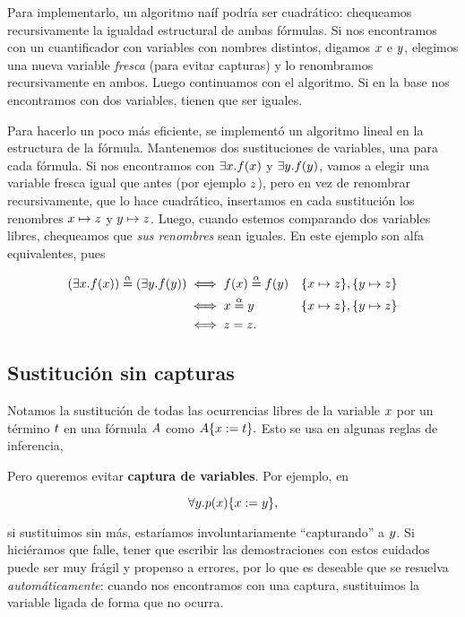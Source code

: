 Para implementarlo, un algoritmo naíf podría ser cuadrático: chequeamos recursivamente la igualdad estructural de ambas fórmulas. Si nos encontramos con un cuantificador con variables con nombres distintos, digamos $x$ e $y$, elegimos una nueva variable \textit{fresca} (para evitar capturas) y lo renombramos recursivamente en ambos. Luego continuamos con el algoritmo. Si en la base nos encontramos con dos variables, tienen que ser iguales.

Para hacerlo un poco más eficiente, se implementó un algoritmo lineal en la estructura de la fórmula. Mantenemos dos sustituciones de variables, una para cada fórmula. Si nos encontramos con $\exists x . f(x)$ y $\exists y . f(y)$, vamos a elegir una variable fresca igual que antes (por ejemplo $z$), pero en vez de renombrar recursivamente, que lo hace cuadrático, insertamos en cada sustitución los renombres $x \mapsto z$ y $y \mapsto z$. Luego, cuando estemos comparando dos variables libres, chequeamos que \textit{sus renombres} sean iguales. En este ejemplo son alfa equivalentes, pues

\begin{align*}
    (\exists x . f(x)) \overset{\alpha}{=} (\exists y . f(y))
    &\iff f(x) \overset{\alpha}{=} f(y)
        &&\{x \mapsto z\}, \{y \mapsto z\}\\
    &\iff x \overset{\alpha}{=} y
        &&\{x \mapsto z\}, \{y \mapsto z\}\\
    &\iff z = z.
\end{align*}

\subsection{Sustitución sin capturas}\label{nd:sec:subst}

Notamos la sustitución de todas las ocurrencias libres de la variable $x$ por un término $t$ en una fórmula $A$ como
\(
    A\{x := t\}.
\)
Esto se usa en algunas reglas de inferencia,

\proofTreeForallE

Pero queremos evitar \textbf{captura de variables}. Por ejemplo, en

\[
    \forall y . p(x)\{x := y\},
\]

si sustituimos sin más, estaríamos involuntariamente ``capturando'' a $y$. Si hiciéramos que falle, tener que escribir las demostraciones con estos cuidados puede ser muy frágil y propenso a errores, por lo que es deseable que se resuelva \textit{automáticamente}: cuando nos encontramos con una captura, sustituimos la variable ligada de forma que no ocurra.

